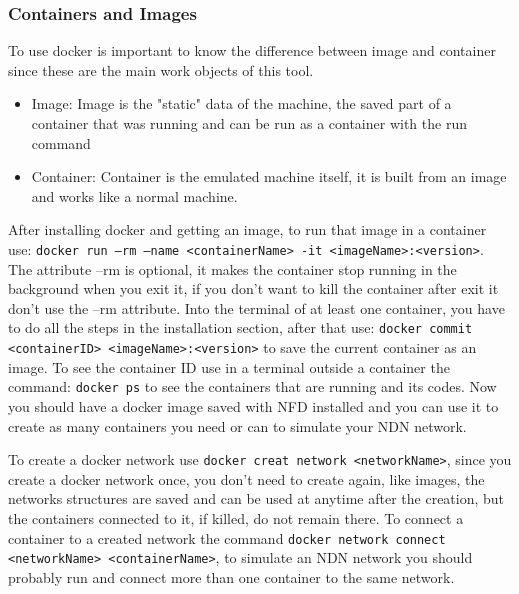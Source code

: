\documentclass[11pt,conference]{./IEEEtran}
\begin{document}
\subsubsection{Containers and Images}
To use docker is important to know the difference between image and container since these are the main work objects of this tool.
\begin{itemize}
 \item Image: Image is the "static" data of the machine, the saved part of a container that was running and can be run as a container with the run command
 \item Container: Container is the emulated machine itself, it is built from an image and works like a normal machine.
\end{itemize}

After installing docker and getting an image, to run that image in a container use: \texttt{docker run --rm --name <containerName> -it <imageName>:<version>}. The attribute --rm is optional, it makes the container stop running in the background when you exit it, if you don't want to kill the container after exit it don't use the --rm attribute.
Into the terminal of at least one container, you have to do all the steps in the installation section, after that use:  \texttt{docker commit <containerID>  <imageName>:<version>}  to save the current container as an image. 
To see the container ID use in a terminal outside a container the command: \texttt{docker ps} to see the containers that are running and its codes.
Now you should have a docker image saved with NFD installed and you can use it to create as many containers you need or can to simulate your NDN network.\par 
To create a docker network use \texttt{docker creat network <networkName>}, since you create a docker network once, you don't need to create again, like images, the networks structures are saved and can be used at anytime after the creation, but the containers connected to it, if killed, do not remain there.
To connect a container to a created network the command \texttt{docker network connect <networkName> <containerName>}, to simulate an NDN network you should probably run and connect more than one container to the same network.
\end{document}
